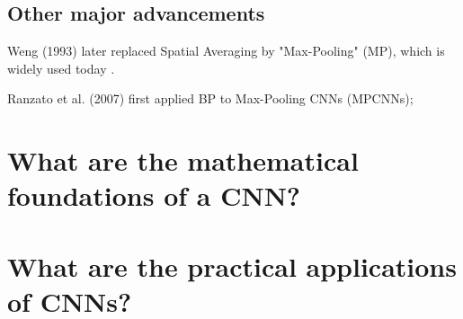 \documentclass{article}
\begin{document}
\subsection{Other major advancements}


Weng (1993) later replaced Spatial Averaging by "Max-Pooling" (MP), which is widely used today \cite{sch}.

Ranzato et al. (2007) first applied BP to Max-Pooling CNNs (MPCNNs); \cite{sch}



\section{What are the mathematical foundations of a CNN?}
\label{sec:math}


\section{What are the practical applications of CNNs?}

















\end{document}
